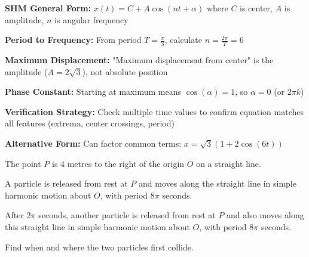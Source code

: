 \begin{takeaways}
\item \textbf{SHM General Form:} $x(t) = C + A\cos(nt + \alpha)$ where $C$ is center, $A$ is amplitude, $n$ is angular frequency
\item \textbf{Period to Frequency:} From period $T = \frac{\pi}{3}$, calculate $n = \frac{2\pi}{T} = 6$
\item \textbf{Maximum Displacement:} "Maximum displacement from center" is the amplitude ($A = 2\sqrt{3}$), not absolute position
\item \textbf{Phase Constant:} Starting at maximum means $\cos(\alpha) = 1$, so $\alpha = 0$ (or $2\pi k$)
\item \textbf{Verification Strategy:} Check multiple time values to confirm equation matches all features (extrema, center crossings, period)
\item \textbf{Alternative Form:} Can factor common terms: $x = \sqrt{3}(1 + 2\cos(6t))$
\end{takeaways}

\newpage

\begin{problem}
The point $P$ is $4$ metres to the right of the origin $O$ on a straight line.

\vspace{0.5em}
\noindent A particle is released from rest at $P$ and moves along the straight line in simple harmonic motion about $O$, with period $8\pi$ seconds.

\vspace{0.5em}
\noindent After $2\pi$ seconds, another particle is released from rest at $P$ and also moves along this straight line in simple harmonic motion about $O$, with period $8\pi$ seconds.

\vspace{0.5em}
\noindent Find when and where the two particles first collide.
\end{problem}

